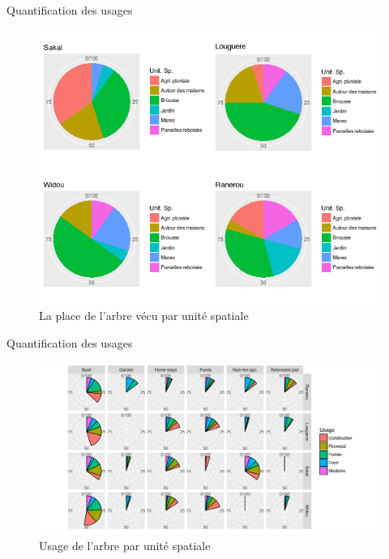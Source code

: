 \documentclass[newPxFont]{beamer}
\begin{document}
\begin{frame}[c]{Quantification des usages}
\vspace{-1cm}
\begin{figure}
  \centering
  \includegraphics[width = \textwidth]{img/pie_general}
  \caption{La place de l'arbre vécu par unité spatiale}
\end{figure}

\end{frame}

\begin{frame}[c]{Quantification des usages}
\vspace{-1cm}
\begin{figure}
  \centering
  \includegraphics[width = \textwidth]{img/pie_se_eng}
  \caption{Usage de l'arbre par unité spatiale}
\end{figure}

\end{frame}
\end{document}
